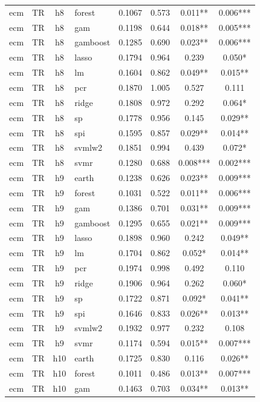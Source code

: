 \begin{ThreePartTable}
\begin{longtable}[t]{llclcccc}
ecm & TR & h8 & forest & 0.1067 & 0.573 & 0.011** & 0.006***\\
ecm & TR & h8 & gam & 0.1198 & 0.644 & 0.018** & 0.005***\\
ecm & TR & h8 & gamboost & 0.1285 & 0.690 & 0.023** & 0.006***\\
ecm & TR & h8 & lasso & 0.1794 & 0.964 & 0.239 & 0.050*\\
ecm & TR & h8 & lm & 0.1604 & 0.862 & 0.049** & 0.015**\\
ecm & TR & h8 & pcr & 0.1870 & 1.005 & 0.527 & 0.111\\
ecm & TR & h8 & ridge & 0.1808 & 0.972 & 0.292 & 0.064*\\
ecm & TR & h8 & sp & 0.1778 & 0.956 & 0.145 & 0.029**\\
ecm & TR & h8 & spi & 0.1595 & 0.857 & 0.029** & 0.014**\\
ecm & TR & h8 & svmlw2 & 0.1851 & 0.994 & 0.439 & 0.072*\\
ecm & TR & h8 & svmr & 0.1280 & 0.688 & 0.008*** & 0.002***\\
\addlinespace
ecm & TR & h9 & earth & 0.1238 & 0.626 & 0.023** & 0.009***\\
ecm & TR & h9 & forest & 0.1031 & 0.522 & 0.011** & 0.006***\\
ecm & TR & h9 & gam & 0.1386 & 0.701 & 0.031** & 0.009***\\
ecm & TR & h9 & gamboost & 0.1295 & 0.655 & 0.021** & 0.009***\\
ecm & TR & h9 & lasso & 0.1898 & 0.960 & 0.242 & 0.049**\\
ecm & TR & h9 & lm & 0.1704 & 0.862 & 0.052* & 0.014**\\
ecm & TR & h9 & pcr & 0.1974 & 0.998 & 0.492 & 0.110\\
ecm & TR & h9 & ridge & 0.1906 & 0.964 & 0.262 & 0.060*\\
ecm & TR & h9 & sp & 0.1722 & 0.871 & 0.092* & 0.041**\\
ecm & TR & h9 & spi & 0.1646 & 0.833 & 0.026** & 0.013**\\
ecm & TR & h9 & svmlw2 & 0.1932 & 0.977 & 0.232 & 0.108\\
ecm & TR & h9 & svmr & 0.1174 & 0.594 & 0.015** & 0.007***\\
\addlinespace
ecm & TR & h10 & earth & 0.1725 & 0.830 & 0.116 & 0.026**\\
ecm & TR & h10 & forest & 0.1011 & 0.486 & 0.013** & 0.007***\\
ecm & TR & h10 & gam & 0.1463 & 0.703 & 0.034** & 0.013**\\

\end{longtable}
\end{ThreePartTable}

